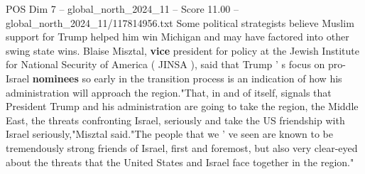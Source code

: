 \begin{textsample}{POS Dim 7 – global\_north\_2024\_11 – Score 11.00 – global\_north\_2024\_11/117814956.txt}
Some political strategists believe Muslim support for Trump helped him win Michigan and may have factored into other swing state wins.
Blaise Misztal, \textbf{vice} president for policy at the Jewish Institute for National Security of America ( JINSA ), said that Trump ' s focus on pro-Israel \textbf{nominees} so early in the transition process is an indication of how his administration will approach the region."That, in and of itself, signals that President Trump and his administration are going to take the region, the Middle East, the threats confronting Israel, seriously and take the US friendship with Israel seriously,"Misztal said."The people that we ' ve seen are known to be tremendously strong friends of Israel, first and foremost, but also very clear-eyed about the threats that the United States and Israel face together in the region."

\end{textsample}
